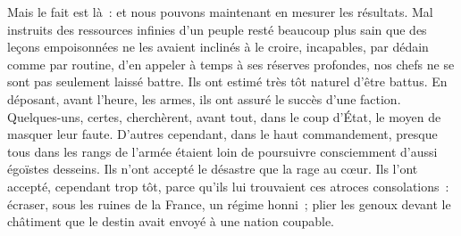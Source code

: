 \documentclass[french,twoside]{book} %
\begin{document}
Mais le fait est là : et nous pouvons maintenant en mesurer les résultats. Mal instruits des ressources infinies d’un peuple resté beaucoup plus sain que des leçons empoisonnées ne les avaient inclinés à le croire, incapables, par dédain comme par routine, d’en appeler à temps à ses réserves profondes, nos chefs ne se sont pas seulement laissé battre. Ils ont estimé très tôt naturel d’être battus. En déposant, avant l’heure, les armes, ils ont assuré le succès d’une faction. Quelques-uns, certes, cherchèrent, avant tout, dans le coup d’État, le moyen de masquer leur faute. D’autres cependant, dans le haut commandement, presque tous dans les rangs de l’armée étaient loin de poursuivre consciemment d’aussi égoïstes desseins. Ils n’ont accepté le désastre que la rage au cœur. Ils l’ont accepté, cependant trop tôt, parce qu’ils lui trouvaient ces atroces consolations : écraser, sous les ruines de la France, un   régime honni ; plier les genoux devant le châtiment que le destin avait envoyé à une nation coupable.\par
\end{document}

